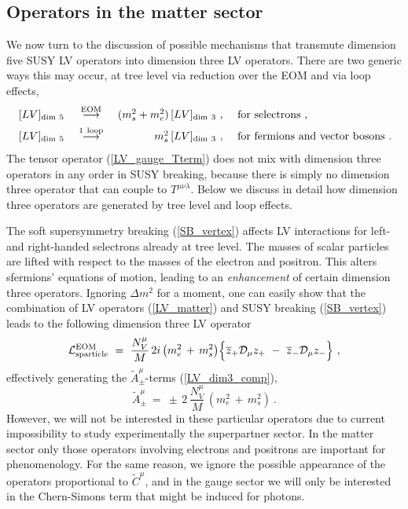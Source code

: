 \documentclass[12pt]{revtex4}
\begin{document}
\subsection{Operators in the matter sector}


We now turn to the discussion of possible mechanisms that transmute
dimension five SUSY LV operators 
into dimension three LV operators. There are two generic ways this 
may occur, at tree level via reduction over the EOM and via loop
effects,   
\begin{equation}
\begin{array}{l c r l} 
\, [LV]_{\rm dim~5} & ~\stackrel{\mathrm {EOM}}{\longrightarrow}~ &
  (m_{s}^2 + m_e^2)\, [LV]_{\rm dim~3}~,~ &{\rm for~selectrons}~, 
\\[1ex] \,
[LV]_{\rm dim~5} &~ \stackrel{\mathrm {1\ loop}}{\longrightarrow}~ &
  m_{s}^2\, [LV]_{\rm dim~3}~,~ & {\rm for~fermions ~and ~vector~bosons}
~.
\end{array}
\nonumber
\end{equation}
%
The tensor operator (\ref{LV_gauge_Tterm}) does not mix with dimension
three operators in any order in SUSY breaking, because there is simply
no dimension three operator that can couple to
$T^{\mu\nu\lambda}$. Below we discuss in detail how dimension
three operators are generated by tree level and loop effects. 


The soft supersymmetry breaking (\ref{SB_vertex}) affects LV
interactions for left- and right-handed selectrons already at tree
level. The masses of scalar particles are lifted with respect to the
masses of the electron and positron. This alters sfermions' equations
of motion, leading to an {\em enhancement} of certain dimension three
operators. Ignoring $\Delta m^2$ for a moment, one can easily show
that the combination of LV operators (\ref{LV_matter}) and SUSY
breaking (\ref{SB_vertex}) leads to the following dimension three LV
operator 
%
\begin{equation}
  \mathcal{L}_{\rm sparticle}^{\rm EOM} ~=~  
\frac{N_V^\mu}{M}\, 2 i\, 
\big(
m_e^2 \,+\,  m_s^2
\big)
\Bigl\{ 
\overline{z}_+ \mathcal{D}_\mu z_+ 
~-~
\overline{z}_- \mathcal{D}_\mu z_- 
\Bigr\}~,  
\end{equation}
%
effectively generating the $ \widetilde{A}^\mu_\pm $-terms
%
(\ref{LV_dim3_comp}), 
 \begin{equation}
\widetilde{A}_\pm^\mu ~=~  
\pm\, 2\, \frac{N_V^\mu}{ M }   \, 
(m_e^2 \, +\,  m_s^2)~.
\end{equation}
%
However, we will not be interested in these particular operators due
to current impossibility to study experimentally  the superpartner
sector. In the matter sector only those operators involving electrons
and positrons are important for phenomenology.  
For the same reason, we ignore the possible appearance of the
operators proportional to $ \widetilde{C}^\mu $, and in the gauge
sector we will only be interested in the Chern-Simons term that might
be induced for photons. 
\end{document}
